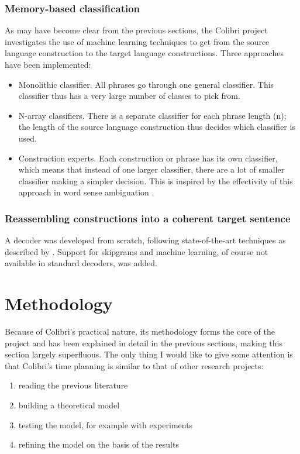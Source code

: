 \documentclass[12pt]{article}
\begin{document}
\subsubsection{Memory-based classification}
As may have become clear from the previous sections, the Colibri project investigates the use of machine learning techniques to get from the source language construction to the target language constructions. Three approaches have been implemented:

\begin{itemize}
\item Monolithic classifier. All phrases go through one general classifier. This classifier thus has a very large number of classes to pick from.
\item N-array classifiers. There is a separate classifier for each phrase length (n); the length of the source language construction thus decides which classifier is used.
\item Construction experts. Each construction or phrase has its own classifier, which means that instead of one larger classifier, there are a lot of smaller classifier making a simpler decision. This is inspired by the effectivity of this approach in word sense ambiguation \citep{vangompel10}.
\end{itemize}

\subsubsection{Reassembling constructions into a coherent target sentence}
A decoder was developed from scratch, following state-of-the-art techniques as described by \citet{koehn03}. Support for skipgrams and machine learning, of course not available in standard decoders, was added.




\section{Methodology}

Because of Colibri's practical nature, its methodology forms the core of the project and has been explained in detail in the previous sections, making this section largely superfluous. The only thing I would like to give some attention is that Colibri's time planning is similar to that of other research projects:

\begin{enumerate}
\item reading the previous literature
\item building a theoretical model
\item testing the model, for example with experiments
\item refining the model on the basis of the results
\end{enumerate}
\end{document}
